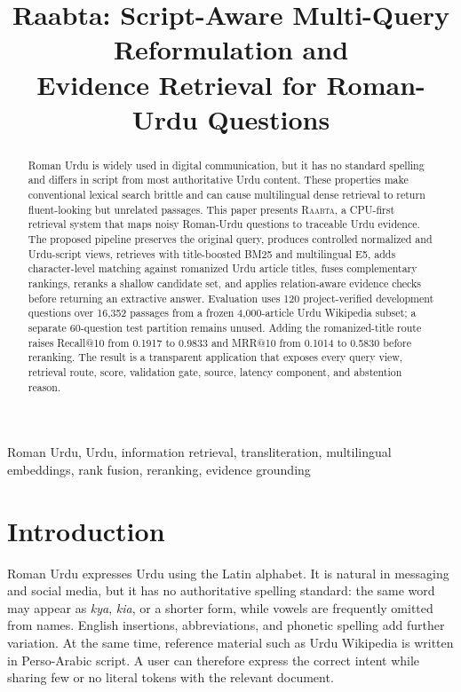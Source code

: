 \documentclass[conference]{IEEEtran}
\title{Raabta: Script-Aware Multi-Query Reformulation and\\
Evidence Retrieval for Roman-Urdu Questions}
\author{
\IEEEauthorblockN{Hasnat Khan}
\IEEEauthorblockA{Assignment Project\\
Information Retrieval and Natural Language Processing}
}
\newcommand{\system}{\textsc{Raabta}}
\begin{document}
\maketitle

\begin{abstract}
Roman Urdu is widely used in digital communication, but it has no standard spelling and differs in script from most authoritative Urdu content. These properties make conventional lexical search brittle and can cause multilingual dense retrieval to return fluent-looking but unrelated passages. This paper presents \system, a CPU-first retrieval system that maps noisy Roman-Urdu questions to traceable Urdu evidence. The proposed pipeline preserves the original query, produces controlled normalized and Urdu-script views, retrieves with title-boosted BM25 and multilingual E5, adds character-level matching against romanized Urdu article titles, fuses complementary rankings, reranks a shallow candidate set, and applies relation-aware evidence checks before returning an extractive answer. Evaluation uses 120 project-verified development questions over 16,352 passages from a frozen 4,000-article Urdu Wikipedia subset; a separate 60-question test partition remains unused. Adding the romanized-title route raises Recall@10 from 0.1917 to 0.9833 and MRR@10 from 0.1014 to 0.5830 before reranking. The result is a transparent application that exposes every query view, retrieval route, score, validation gate, source, latency component, and abstention reason.
\end{abstract}

\begin{IEEEkeywords}
Roman Urdu, Urdu, information retrieval, transliteration, multilingual embeddings, rank fusion, reranking, evidence grounding
\end{IEEEkeywords}

\section{Introduction}
Roman Urdu expresses Urdu using the Latin alphabet. It is natural in messaging and social media, but it has no authoritative spelling standard: the same word may appear as \emph{kya}, \emph{kia}, or a shorter form, while vowels are frequently omitted from names. English insertions, abbreviations, and phonetic spelling add further variation. At the same time, reference material such as Urdu Wikipedia is written in Perso-Arabic script. A user can therefore express the correct intent while sharing few or no literal tokens with the relevant document.
\end{document}
